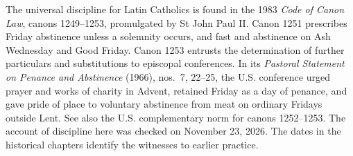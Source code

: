 The universal discipline for Latin Catholics is found in the 1983 \emph{Code of Canon Law}, canons 1249--1253, promulgated by St John Paul II. Canon 1251 prescribes Friday abstinence unless a solemnity occurs, and fast and abstinence on Ash Wednesday and Good Friday. Canon 1253 entrusts the determination of further particulars and substitutions to episcopal conferences. In its \emph{Pastoral Statement on Penance and Abstinence} (1966), nos.~7, 22--25, the U.S. conference urged prayer and works of charity in Advent, retained Friday as a day of penance, and gave pride of place to voluntary abstinence from meat on ordinary Fridays outside Lent. See also the U.S. complementary norm for canons 1252--1253. The account of discipline here was checked on November 23, 2026. The dates in the historical chapters identify the witnesses to earlier practice.
